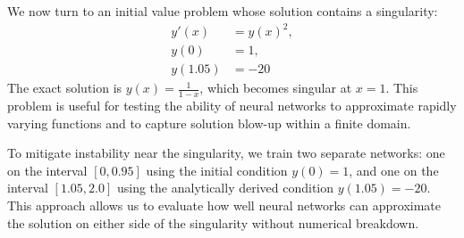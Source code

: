 We now turn to an initial value problem whose solution contains a singularity:
\[
\begin{aligned}
    y'(x) &= y(x)^2, \\
    y(0) &= 1, \\
    y(1.05) &= -20
\end{aligned}
\]
The exact solution is \( y(x) = \frac{1}{1 - x} \), which becomes singular at \( x = 1 \). This 
problem is useful for testing the ability of neural networks to approximate rapidly varying functions 
and to capture solution blow-up within a finite domain.

To mitigate instability near the singularity, we train two separate networks: one on the interval 
\([0, 0.95]\) using the initial condition \( y(0) = 1 \), and one on the interval \([1.05, 2.0] \) 
using the analytically derived condition \( y(1.05) = -20 \). This approach allows us to evaluate how 
well neural networks can approximate the solution on either side of the singularity without 
numerical breakdown.

